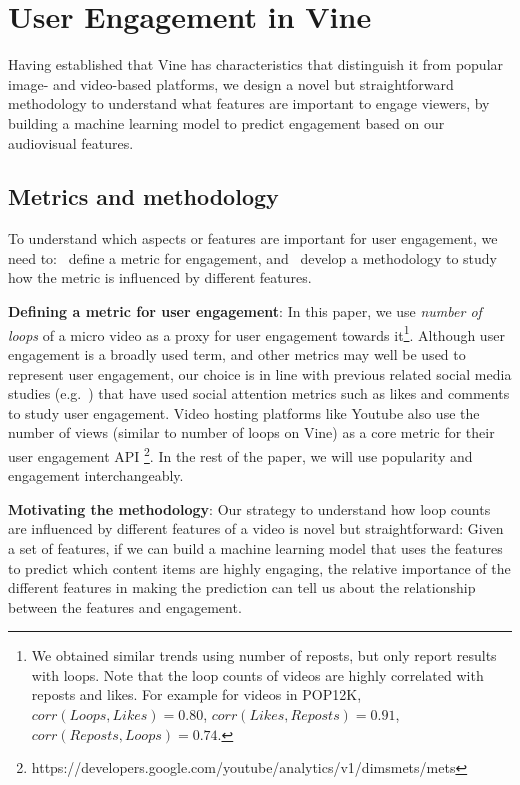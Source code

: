\section{User Engagement in Vine}
\label{sec:classifier}
Having established that Vine has characteristics that distinguish it from popular image- and video-based platforms, we design a novel but straightforward methodology to understand what features are important to engage viewers, by building a  machine learning model to predict engagement based on our audiovisual features. %

\subsection{Metrics and methodology}
\label{sec:methodology}
To understand which aspects or features are important for user engagement, we need to: \one\ define a metric for engagement, and \two\ develop a methodology to study how the metric is influenced by different features. 

\noindent\textbf{Defining a metric for user engagement}:  In this paper, we  use \emph{number of loops} of a micro video as a proxy for user engagement towards it\footnote{We obtained similar trends using number of reposts, but only report results with loops. Note that the loop counts of videos are highly correlated with reposts and likes. For example for videos in POP12K, $ corr(Loops,Likes) = 0.80$, $corr(Likes,Reposts) = 0.91$, $corr(Reposts,Loops) = 0.74$.}.
Although user engagement is a broadly used term, and other metrics may well be used to represent user engagement, our choice is in line with previous related social media studies (e.g.~\cite{bakhshi2014faces})  that have used social attention metrics such as likes and comments to study user engagement. Video hosting platforms like Youtube also use the number of views (similar to number of loops on Vine) as a core metric for their user engagement API \footnote{https://developers.google.com/youtube/analytics/v1/dimsmets/mets}. In the rest of the paper, we will use popularity and engagement interchangeably.

\noindent\textbf{Motivating the methodology}: 
Our strategy to understand how loop counts are influenced by different features of a video is novel but straightforward: Given a set of features, if we can build a machine learning model that uses the features to predict which content items are highly engaging, the relative importance of the different features in making the prediction can tell us about the relationship between the features and engagement. 

